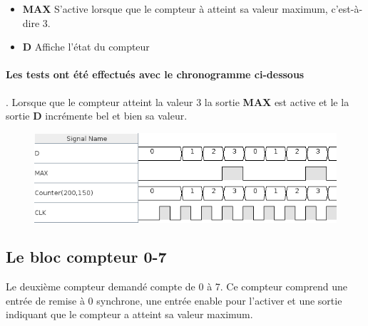 \documentclass[a4paper]{article} %
\begin{document}
\begin{tcolorbox}[colframe=Monokaimagenta,colback=white]
\begin{itemize}
    \item     \textbf{MAX} S'active lorsque que le compteur à atteint sa valeur maximum, c'est-à-dire 3.
    \item     \textbf{D} Affiche l'état du compteur
\end{itemize}



\paragraph{Les tests ont été effectués avec le chronogramme ci-dessous}. Lorsque que le compteur atteint la valeur $3$ la sortie \textbf{MAX} est active et le la sortie \textbf{D} incrémente bel et bien sa valeur.

\begin{figure}[H]
\centering
    \includegraphics[width=1\textwidth]{src/chrono_COUNT_4.png}
    \label{fig:count4bits}
\end{figure}

\end{tcolorbox}
\pagebreak
\subsection{Le bloc compteur 0-7}
Le deuxième compteur demandé compte de 0 à 7. Ce compteur comprend une entrée de remise à 0 synchrone, une entrée enable pour l’activer et une sortie indiquant que le compteur a atteint sa valeur maximum.
\end{document}
